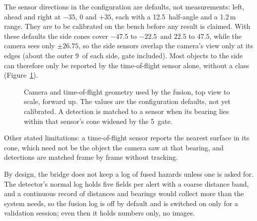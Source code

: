 The sensor directions in the configuration are defaults, not measurements: left, ahead and right at $-35$, 0 and $+35$\textdegree, each with a 12.5\textdegree\ half-angle and a 1.2\,m range. They are to be calibrated on the bench before any result is claimed. With these defaults the side cones cover $-47.5$ to $-22.5$\textdegree\ and $22.5$ to $47.5$\textdegree, while the camera sees only $\pm 26.75$\textdegree, so the side sensors overlap the camera's view only at its edges (about the outer 9\textdegree\ of each side, gate included). Most objects to the side can therefore only be reported by the time-of-flight sensor alone, without a class (Figure~\ref{fig:fusion-geometry}).

\begin{figure}[htbp]
\centering

\caption{Camera and time-of-flight geometry used by the fusion, top view to scale, forward up. The values are the configuration defaults, not yet calibrated. A detection is matched to a sensor when its bearing lies within that sensor's cone widened by the 5\textdegree\ gate.}
\label{fig:fusion-geometry}
\end{figure} Other stated limitations: a time-of-flight sensor reports the nearest surface in its cone, which need not be the object the camera saw at that bearing, and detections are matched frame by frame without tracking.

By design, the bridge does not keep a log of fused hazards unless one is asked for. The detector's normal log holds five fields per alert with a coarse distance band, and a continuous record of distances and bearings would collect more than the system needs, so the fusion log is off by default and is switched on only for a validation session; even then it holds numbers only, no images.

